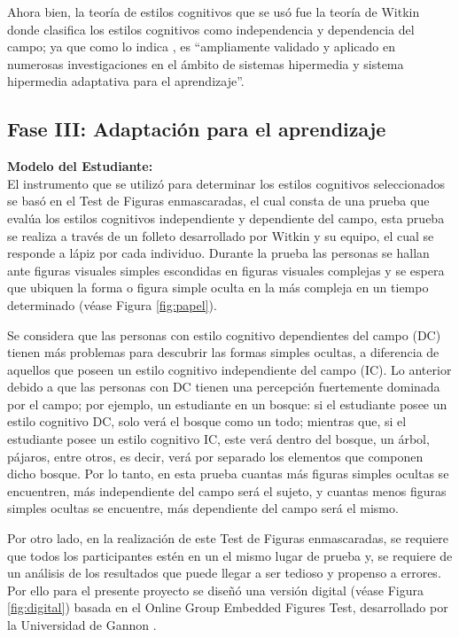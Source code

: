 Ahora bien, la teoría de estilos cognitivos que se usó fue la teoría de Witkin donde clasifica los estilos cognitivos como independencia y dependencia del campo; ya que como lo indica  \cite{Ferraro2006}, es ``ampliamente validado y aplicado en numerosas investigaciones en el ámbito de sistemas hipermedia y sistema hipermedia adaptativa para el aprendizaje”.

\subsection{Fase III: Adaptación para el aprendizaje}
\textbf{Modelo del Estudiante:}\ \\
El instrumento que se utilizó para determinar los estilos cognitivos seleccionados se basó en el Test de Figuras enmascaradas, el cual consta de una prueba que evalúa los estilos cognitivos independiente y dependiente del campo, esta prueba se realiza a través de un folleto desarrollado por Witkin y su equipo, el cual se responde a lápiz por cada individuo. Durante la prueba las personas se hallan ante figuras visuales simples escondidas en figuras visuales complejas y se espera que ubiquen la forma o figura simple oculta en la más compleja en un tiempo determinado (véase Figura \ref{fig:papel}).

Se considera que las personas con estilo cognitivo dependientes del campo (DC) tienen más problemas para descubrir las formas simples ocultas, a diferencia de aquellos que poseen un estilo cognitivo independiente del campo (IC). Lo anterior debido a que las personas con DC tienen una percepción fuertemente dominada por el campo; por ejemplo, un estudiante en un bosque: si el estudiante posee un estilo cognitivo DC, solo verá el bosque como un todo; mientras que, si el estudiante posee un estilo cognitivo IC, este verá dentro del bosque, un árbol, pájaros, entre otros, es decir, verá por separado los elementos que componen dicho bosque. Por lo tanto, en esta prueba cuantas más figuras simples ocultas se encuentren, más independiente del campo será el sujeto, y cuantas menos figuras simples ocultas se encuentre, más dependiente del campo será el mismo.

Por otro lado, en la realización de este Test de Figuras enmascaradas, se requiere que todos los participantes estén en un el mismo lugar de prueba y, se requiere de un análisis de los resultados que puede llegar a ser tedioso y propenso a errores. Por ello para el presente proyecto se diseñó una versión digital (véase Figura \ref{fig:digital}) basada en el Online Group Embedded Figures Test, desarrollado por la Universidad de Gannon \cite{Yoo2006}. 

